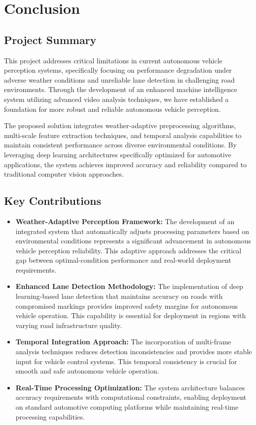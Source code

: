 \chapter{Conclusion}

\section{Project Summary}
This project addresses critical limitations in current autonomous vehicle perception systems, specifically focusing on performance degradation under adverse weather conditions and unreliable lane detection in challenging road environments. Through the development of an enhanced machine intelligence system utilizing advanced video analysis techniques, we have established a foundation for more robust and reliable autonomous vehicle perception.

The proposed solution integrates weather-adaptive preprocessing algorithms, multi-scale feature extraction techniques, and temporal analysis capabilities to maintain consistent performance across diverse environmental conditions. By leveraging deep learning architectures specifically optimized for automotive applications, the system achieves improved accuracy and reliability compared to traditional computer vision approaches.

\section{Key Contributions}
\begin{itemize}
    \item \textbf{Weather-Adaptive Perception Framework:} The development of an integrated system that automatically adjusts processing parameters based on environmental conditions represents a significant advancement in autonomous vehicle perception reliability. This adaptive approach addresses the critical gap between optimal-condition performance and real-world deployment requirements.

    \item \textbf{Enhanced Lane Detection Methodology:} The implementation of deep learning-based lane detection that maintains accuracy on roads with compromised markings provides improved safety margins for autonomous vehicle operation. This capability is essential for deployment in regions with varying road infrastructure quality.

    \item \textbf{Temporal Integration Approach:} The incorporation of multi-frame analysis techniques reduces detection inconsistencies and provides more stable input for vehicle control systems. This temporal consistency is crucial for smooth and safe autonomous vehicle operation.

    \item \textbf{Real-Time Processing Optimization:} The system architecture balances accuracy requirements with computational constraints, enabling deployment on standard automotive computing platforms while maintaining real-time processing capabilities.
\end{itemize}

